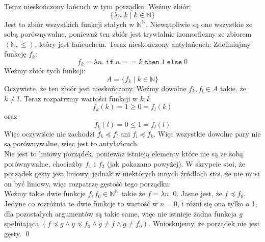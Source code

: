 \documentclass[10pt]{article}
\newcommand{\N}{\mathbb{N}}
\begin{document}
Teraz nieskończony łańcuch w tym porządku: Weźmy zbiór:
$$\{ \lambda n. k  \mid k \in \N\}$$
Jest to zbiór wszystkich funkcji stałych w $\N^\N$. Niewątpliwie są one wszystkie ze sobą porównywalne, ponieważ ten zbiór jest trywialnie izomorficzny ze zbiorem  $\left\langle \N , \leq \right\rangle$, który jest łańcuchem. \newpage
Teraz nieskończony antyłańcuch: Zdefiniujmy funkcję $f_k$:
$$f_k = \lambda n. \; \mathtt{if} \; n == k \; \mathtt{then} \; 1 \; \mathtt{else} \; 0$$
Weźmy zbiór tych funkcji:
$$A = \{ f_k \mid k \in \N \}$$
Oczywiste, że ten zbiór jest nieskończony. Weźmy dowolne $f_k, f_l \in A$ takie, że $k \neq l$. Teraz rozpatrzmy wartości funkcji w $k, l$:
$$f_k(k) = 1 \geq 0 = f_l(k)$$
oraz
$$f_k(l) = 0 \leq 1 = f_l(l)$$
Więc oczywiście nie zachodzi $f_k \preceq f_l$ ani $f_l \preceq f_k$. Więc wszystkie dowolne pary nie są porównywalne, więc jest to antyłańcuch. \\[10pt]
Nie jest to liniowy porządek, ponieważ istnieją elementy które nie są ze sobą porównywalne, chociażby $f_1$ i $f_2$ (jak pokazano powyżej). W skrypcie stoi, że porządek gęsty jest liniowy, jednak w niektórych innych źródłach stoi, że nie musi on być liniowy, więc rozpatrzę gęstość tego porządku: \\[5pt]
Weźmy takie dwie funkcje $f, f_0 \in \N^\N$ takie że $f = \lambda n. \; 0$. Jasne jest, że $f \preceq f_0$. Jedyne co rozróżnia te dwie funkcje to wartość w $n = 0$, i różni się ona tylko o 1, dla pozostałych argumentów są takie same, więc nie istnieje żadna funkcja $g$ spełniająca $(f \preceq g \land g \preceq f_0 \land g \neq f \land g \neq f_0)$. Wnioskujemy, że porządek nie jest gęsty. \qed

\vspace{20pt}
\end{document}
